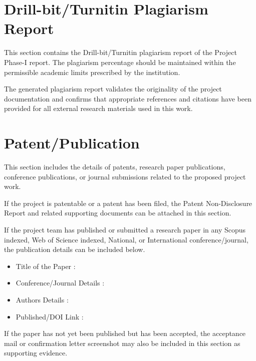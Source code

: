 \documentclass[12pt,a4paper]{report}
\begin{document}
\appendix
\chapter{Drill-bit/Turnitin Plagiarism Report}
This section contains the Drill-bit/Turnitin plagiarism report of the Project Phase-I report. The plagiarism percentage should be maintained within the permissible academic limits prescribed by the institution.

The generated plagiarism report validates the originality of the project documentation and confirms that appropriate references and citations have been provided for all external research materials used in this work.

\chapter{Patent/Publication}
This section includes the details of patents, research paper publications, conference publications, or journal submissions related to the proposed project work.

If the project is patentable or a patent has been filed, the Patent Non-Disclosure Report and related supporting documents can be attached in this section.

If the project team has published or submitted a research paper in any Scopus indexed, Web of Science indexed, National, or International conference/journal, the publication details can be included below.

\vspace{0.3in}
\begin{itemize}
 \item Title of the Paper :

 \item Conference/Journal Details :

 \item Authors Details :

 \item Published/DOI Link :
\end{itemize}
\vspace{0.3in}

\noindent If the paper has not yet been published but has been accepted, the acceptance mail or confirmation letter screenshot may also be included in this section as supporting evidence.
\end{document}
